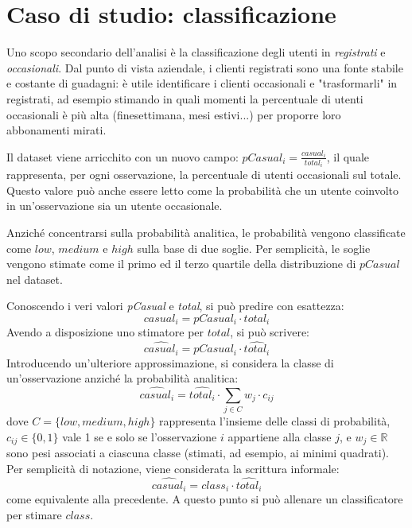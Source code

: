 \documentclass[a4paper, 10pt]{report}
\begin{document}
\appendix
\chapter{Caso di studio: classificazione}
\label{app:classification}
Uno scopo secondario dell'analisi è la classificazione degli utenti in
\emph{registrati} e \emph{occasionali}. Dal punto di vista aziendale,
i clienti registrati sono una fonte stabile e costante di guadagni: è
utile identificare i clienti occasionali e "trasformarli" in registrati,
ad esempio stimando in quali momenti la percentuale di utenti occasionali
è più alta (finesettimana, mesi estivi...) per proporre loro abbonamenti
mirati.

Il dataset viene arricchito con un nuovo campo:
$pCasual_i = \frac{casual_i}{total_i}$, il quale rappresenta, per ogni
osservazione, la percentuale di utenti occasionali sul totale. Questo
valore può anche essere letto come la probabilità che un utente coinvolto
in un'osservazione sia un utente occasionale.

Anziché concentrarsi sulla probabilità analitica, le probabilità vengono
classificate come $low$, $medium$ e $high$ sulla base di due soglie. Per
semplicità, le soglie vengono stimate come il primo ed il terzo quartile
della distribuzione di $pCasual$ nel dataset.

Conoscendo i veri valori \emph{pCasual} e \emph{total}, si può predire con
esattezza:
\begin{equation}
  casual_i = pCasual_i \cdot total_i
\end{equation}
Avendo a disposizione uno stimatore per $total$, si può scrivere:
\begin{equation}
  \widehat{casual_i} = pCasual_i \cdot \widehat{total_i}
\end{equation}
Introducendo un'ulteriore approssimazione, si considera la classe di
un'osservazione anziché la probabilità analitica:
\begin{equation}
  \widehat{casual_i} = \widehat{total_i} \cdot \sum\limits_{j \in C} {w_j \cdot c_{ij}}
\end{equation}
dove $C = \{low, medium, high\}$ rappresenta l'insieme delle classi di probabilità,
$c_{ij} \in \{0, 1\}$ vale 1 se e solo se l'osservazione $i$ appartiene alla classe $j$, e
$w_j \in \mathbb{R}$ sono pesi associati a ciascuna classe (stimati, ad esempio, ai
minimi quadrati). Per semplicità di notazione, viene considerata la scrittura informale:
\begin{equation}
  \widehat{casual_i} = class_i \cdot \widehat{total_i}
\end{equation}
come equivalente alla precedente. A questo punto si può allenare un
classificatore per stimare $class$.
\end{document}
